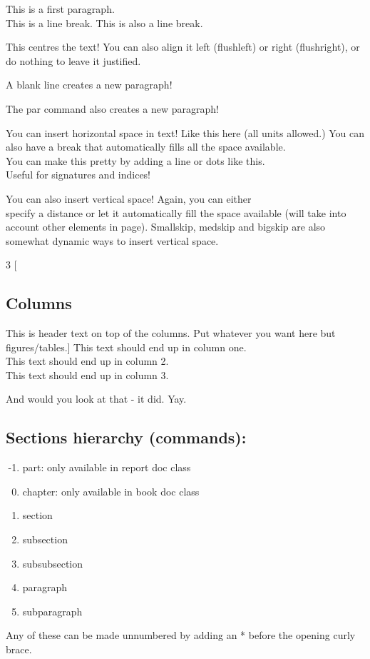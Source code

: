 \documentclass[12pt, letterpaper]{article} %
\begin{document}
This is a first paragraph.\\
This is a line break.\newline
This is also a line break. %

\begin{center}
	This centres the text! You can also align it left (flushleft) or right (flushright), or do nothing to leave it justified.
	
	A blank line creates a new paragraph!\par
	The par command also creates a new paragraph!
\end{center}

You can insert horizontal space in text! Like this \hspace{1cm} here (all units allowed.) You can also have a break that \hfill automatically fills all the space available. \\ You can make this pretty by adding a line \hrulefill or dots \dotfill like this. \\Useful for signatures and indices!

You can also insert vertical space! Again, you can either \vspace{5mm}\\specify a distance or let it automatically \vfill fill the space available (will take into account other elements in page). Smallskip, medskip and bigskip are also somewhat dynamic ways to insert vertical space.

\begin{multicols}{3} %
	[\subsection*{Columns}
	This is header text on top of the columns. Put whatever you want here but figures/tables.]
	This text should end up in column one. \\ This text should end up in column 2. \\ This text should end up in column 3.
\end{multicols}
And would you look at that - it did. Yay.


\clearpage
\subsection*{Sections hierarchy (commands):} %

\begin{enumerate}
	\setcounter{enumi}{-2} %
	\item part: only available in report doc class
	\item chapter: only available in book doc class
	\item section
	\item subsection
	\item subsubsection
	\item paragraph
	\item subparagraph
\end{enumerate}
Any of these can be made unnumbered by adding an * before the opening curly brace.
\end{document}
